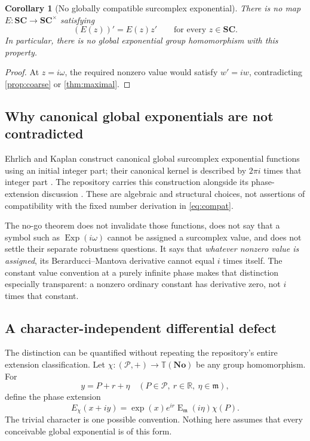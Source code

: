 \documentclass[11pt,letterpaper]{article}
\numberwithin{equation}{section}
\newtheorem{corollary}[corollary]{Corollary}
\theoremstyle{definition}
\theoremstyle{remark}
\newcommand{\No}{\mathbf{No}}
\newcommand{\SC}{\mathbf{SC}}
\newcommand{\R}{\mathbb R}
\newcommand{\mm}{\mathfrak m}
\newcommand{\PPi}{\mathcal P}
\newcommand{\Em}{\operatorname{E}_{\mm}}
\newcommand{\ttt}{\mathbb T}
\begin{document}
\begin{corollary}[No globally compatible surcomplex exponential]\label{cor:noglobal}
There is no map $E:\SC\to\SC^\times$ satisfying
\[
 (E(z))'=E(z)z'\qquad\text{for every }z\in\SC.
\]
In particular, there is no global exponential group homomorphism with this property.
\end{corollary}
\begin{proof}
At $z=i\omega$, the required nonzero value would satisfy $w'=iw$, contradicting \cref{prop:coarse} or \cref{thm:maximal}.
\end{proof}

\subsection{Why canonical global exponentials are not contradicted}
Ehrlich and Kaplan construct canonical global surcomplex exponential functions using an initial integer part; their canonical kernel is described by $2\pi i$ times that integer part \cite[\S11]{EK}. The repository carries this construction alongside its phase-extension discussion \cite{RepoTrig}. These are algebraic and structural choices, not assertions of compatibility with the fixed number derivation in \eqref{eq:compat}.

The no-go theorem does not invalidate those functions, does not say that a symbol such as $\operatorname{Exp}(i\omega)$ cannot be assigned a surcomplex value, and does not settle their separate robustness questions. It says that \emph{whatever nonzero value is assigned}, its Berarducci--Mantova derivative cannot equal $i$ times itself. The constant value convention at a purely infinite phase makes that distinction especially transparent: a nonzero ordinary constant has derivative zero, not $i$ times that constant.

\subsection{A character-independent differential defect}
The distinction can be quantified without repeating the repository's entire extension classification. Let $\chi:(\PPi,+)\to\ttt(\No)$ be any group homomorphism. For
\[
 y=P+r+\eta\quad(P\in\PPi,\ r\in\R,\ \eta\in\mm),
\]
define the phase extension
\[
 E_\chi(x+iy)=\exp(x)e^{ir}\Em(i\eta)\chi(P).
\]
The trivial character is one possible convention. Nothing here assumes that every conceivable global exponential is of this form.
\end{document}
